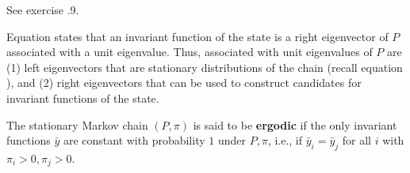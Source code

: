 \endtheorem

\proof See exercise \the\chapternum.9.  
\endproof





Equation 
  states that an invariant function of the state is
a right eigenvector of $P$ associated with a unit eigenvalue.
Thus, associated with unit eigenvalues of $P$ are (1) left eigenvectors that are stationary distributions of the chain (recall equation ),
and (2) right eigenvectors that can be used to construct  candidates for  invariant functions of the state. %


 The stationary Markov chain $(P, \pi)$ is said to be {\bf ergodic} if the only invariant functions $\bar y$ are 
constant with probability $1$ under $P, \pi$, i.e., if $\bar y_i = \bar y_j$ for all $i$ with $\pi_i >0, \pi_j >0$.  
\enddefinition



